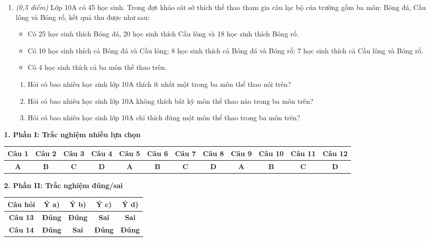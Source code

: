 \documentclass[12pt,a4paper]{article}
\newcommand{\parttitle}[1]{\par\vspace{2pt}\nopagebreak{\large\bfseries\color{ink}#1}\par\nopagebreak\vspace{1pt}}
\begin{document}
\begin{enumerate}[resume]
\item \textit{(0,5 điểm)} Lớp 10A có 45 học sinh. Trong đợt khảo sát sở thích thể thao tham gia câu lạc bộ của trường gồm ba môn: Bóng đá, Cầu lông và Bóng rổ, kết quả thu được như sau:
\begin{itemize}[leftmargin=0.5cm]
    \item Có 25 học sinh thích Bóng đá, 20 học sinh thích Cầu lông và 18 học sinh thích Bóng rổ.
    \item Có 10 học sinh thích cả Bóng đá và Cầu lông; 8 học sinh thích cả Bóng đá và Bóng rổ; 7 học sinh thích cả Cầu lông và Bóng rổ.
    \item Có 4 học sinh thích cả ba môn thể thao trên.
\end{itemize}
\begin{enumerate}
    \item Hỏi có bao nhiêu học sinh lớp 10A thích ít nhất một trong ba môn thể thao nói trên?
    \item Hỏi có bao nhiêu học sinh lớp 10A không thích bất kỳ môn thể thao nào trong ba môn trên?
    \item Hỏi có bao nhiêu học sinh lớp 10A chỉ thích đúng một môn thể thao trong ba môn trên?
\end{enumerate}
\end{enumerate}

\newpage
\parttitle{BẢNG ĐÁP ÁN TỔNG HỢP}

\vspace{0.2cm}
\textbf{1. Phần I: Trắc nghiệm nhiều lựa chọn}
\begin{center}
{\setlength{\tabcolsep}{2.5pt}\small
\begin{tabular}{|c|c|c|c|c|c|c|c|c|c|c|c|}
\hline
\textbf{Câu 1} & \textbf{Câu 2} & \textbf{Câu 3} & \textbf{Câu 4} & \textbf{Câu 5} & \textbf{Câu 6} & \textbf{Câu 7} & \textbf{Câu 8} & \textbf{Câu 9} & \textbf{Câu 10} & \textbf{Câu 11} & \textbf{Câu 12} \\
\hline
\textbf{A} & \textbf{B} & \textbf{C} & \textbf{D} & \textbf{A} & \textbf{B} & \textbf{C} & \textbf{D} & \textbf{A} & \textbf{B} & \textbf{C} & \textbf{D} \\
\hline
\end{tabular}}
\end{center}

\vspace{0.2cm}
\textbf{2. Phần II: Trắc nghiệm đúng/sai}
\begin{center}
\begin{tabular}{|c|c|c|c|c|}
\hline
\textbf{Câu hỏi} & \textbf{Ý a)} & \textbf{Ý b)} & \textbf{Ý c)} & \textbf{Ý d)} \\
\hline
\textbf{Câu 13} & \textbf{Đúng} & \textbf{Đúng} & \textbf{Sai} & \textbf{Sai} \\
\hline
\textbf{Câu 14} & \textbf{Đúng} & \textbf{Sai} & \textbf{Đúng} & \textbf{Đúng} \\
\hline
\end{tabular}
\end{center}
\end{document}
